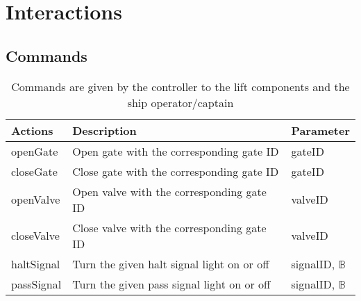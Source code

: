 \section{Interactions}
\subsection{Commands}
\begin{table}[htbp]
	\centering
	\caption{Commands are given by the controller to the lift components and the ship operator/captain}
	\begin{tabular}{lll}
		\toprule
		\textbf{Actions} & \textbf{Description} & \textbf{Parameter} \\
		\midrule
		openGate & Open gate with the corresponding gate ID & gateID \\
		closeGate & Close gate with the corresponding gate ID & gateID \\
		openValve & Open valve with the corresponding gate ID & valveID \\
		closeValve & Close valve with the corresponding gate ID & valveID \\
		haltSignal & Turn the given halt signal light on or off & signalID, $\mathbb{B}$\\
		passSignal & Turn the given pass signal light on or off & signalID, $\mathbb{B}$\\

\bottomrule
\end{tabular}%
\label{tab:addlabel}%
\end{table}%
		
		
		


		
